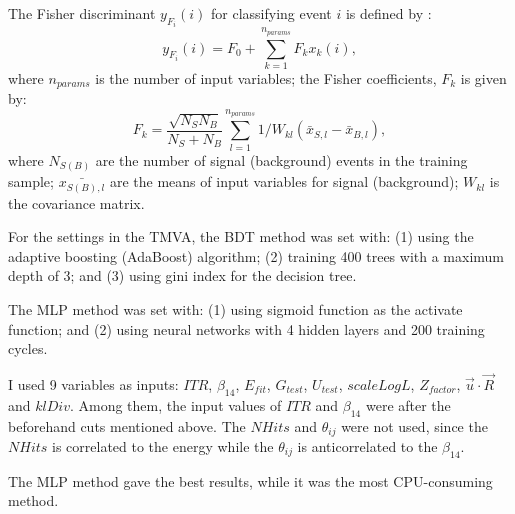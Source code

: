 The Fisher discriminant $y_{F_i}(i)$ for classifying event $i$ is defined by \cite{tmvaWebsite}:
\begin{equation}
y_{F_i}(i) = F_0+\sum_{k=1}^{n_{params}}F_k x_k(i),
\end{equation}
where $n_{params}$ is the number of input variables; the Fisher coefficients, $F_k$ is given by:
\begin{equation}
F_k = \frac{\sqrt{N_SN_B}}{N_S+N_B}\sum_{l=1}^{n_{params}}1/W_{kl}(\bar{x}_{S,l}-\bar{x}_{B,l}),
\end{equation} 
where $N_{S(B)}$ are the number of signal (background) events in the training sample; $\bar{x_{S(B),l}}$ are the means of input variables for signal (background); $W_{kl}$ is the covariance matrix\cite{tmvaWebsite}.

For the settings in the TMVA, the BDT method was set with: (1) using the adaptive boosting (AdaBoost) algorithm; (2) training 400 trees with a maximum depth of 3; and (3) using gini index for the decision tree. 

The MLP method was set with: (1) using sigmoid function as the activate function; and (2) using neural networks with 4 hidden layers and 200 training cycles.

I used 9 variables as inputs: $ITR$, $\beta_{14}$, $E_{fit}$, $G_{test}$, $U_{test}$, $scaleLogL$, $Z_{factor}$, $\vec{u}\cdot \vec{R}$ and $klDiv$. Among them, the input values of $ITR$ and $\beta_{14}$ were after the beforehand cuts mentioned above. The $NHits$ and $\theta_{ij}$ were not used, since the $NHits$ is correlated to the energy while the $\theta_{ij}$ is anticorrelated to the $\beta_{14}$.


The MLP method gave the best results, while it was the most CPU-consuming method.


